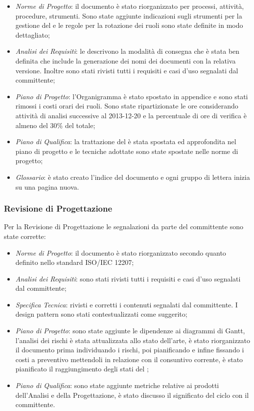 		\begin{itemize}
			\item \emph{Norme di Progetto}: il documento è stato riorganizzato per processi, attività, procedure, strumenti. Sono state aggiunte indicazioni sugli strumenti per la gestione del  e le regole per la rotazione dei ruoli sono state definite in modo dettagliato;
			\item \emph{Analisi dei Requisiti}: le \NormeDiProgetto{} descrivono la modalità di consegna che è stata ben definita che include la generazione dei nomi dei documenti con la relativa versione. Inoltre sono stati rivisti tutti i requisiti e casi d'uso segnalati dal committente;
			\item \emph{Piano di Progetto}: l'Organigramma è stato spostato in appendice e sono stati rimossi i costi orari dei ruoli. Sono state ripartizionate le ore considerando attività di analisi successive al 2013-12-20 e la percentuale di ore di verifica è almeno del 30\% del totale;
			\item \emph{Piano di Qualifica}: la trattazione del  è stata spostata ed approfondita nel piano di progetto e le tecniche adottate sono state spostate nelle norme di progetto;
			\item \emph{Glossario}: è stato creato l'indice del documento e ogni gruppo di lettera inizia su una pagina nuova.
		\end{itemize}
		
		\subsubsection{Revisione di Progettazione}

		Per la Revisione di Progettazione le segnalazioni da parte del committente sono state corrette:
		
		\begin{itemize}
			\item \emph{Norme di Progetto}: il documento è stato riorganizzato secondo quanto definito nello standard ISO/IEC 12207;
			\item \emph{Analisi dei Requisiti}: sono stati rivisti tutti i requisiti e casi d'uso segnalati dal committente;
			\item \emph{Specifica Tecnica}: rivisti e corretti i contenuti segnalati dal committente. I design pattern sono stati contestualizzati come suggerito;
			\item \emph{Piano di Progetto}: sono state aggiunte le dipendenze ai diagrammi di Gantt, l'analisi dei rischi è stata attualizzata allo stato dell'arte, è stato riorganizzato il documento prima individuando i rischi, poi pianificando e infine fissando i costi a preventivo mettendoli in relazione con il consuntivo corrente, è stato pianificato il raggiungimento degli stati del ;
			\item \emph{Piano di Qualifica}: sono state aggiunte metriche relative ai prodotti dell'Analisi e della Progettazione, è stato discusso il significato del ciclo  con il committente.
		\end{itemize}

			


	
